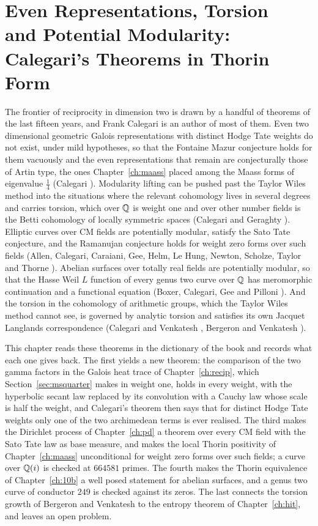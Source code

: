 \chapter[Even Representations, Torsion and Potential Modularity]{Even Representations, Torsion\\ and Potential Modularity:\\ Calegari's Theorems in Thorin Form}\label{ch:cal}

The frontier of reciprocity in dimension two is drawn by a handful of theorems of the last fifteen years, and Frank Calegari is an author of most of them. Even two dimensional geometric Galois representations with distinct Hodge Tate weights do not exist, under mild hypotheses, so that the Fontaine Mazur conjecture holds for them vacuously and the even representations that remain are conjecturally those of Artin type, the ones Chapter~\ref{ch:maass} placed among the Maass forms of eigenvalue $\frac14$ (Calegari \cite{calegari2011,calegari2012}). Modularity lifting can be pushed past the Taylor Wiles method into the situations where the relevant cohomology lives in several degrees and carries torsion, which over $\mathbb{Q}$ is weight one and over other number fields is the Betti cohomology of locally symmetric spaces (Calegari and Geraghty \cite{calegarigeraghty2018}). Elliptic curves over CM fields are potentially modular, satisfy the Sato Tate conjecture, and the Ramanujan conjecture holds for weight zero forms over such fields (Allen, Calegari, Caraiani, Gee, Helm, Le Hung, Newton, Scholze, Taylor and Thorne \cite{accghlnstt2023}). Abelian surfaces over totally real fields are potentially modular, so that the Hasse Weil $L$ function of every genus two curve over $\mathbb{Q}$ has meromorphic continuation and a functional equation (Boxer, Calegari, Gee and Pilloni \cite{bcgp2021}). And the torsion in the cohomology of arithmetic groups, which the Taylor Wiles method cannot see, is governed by analytic torsion and satisfies its own Jacquet Langlands correspondence (Calegari and Venkatesh \cite{calegarivenkatesh2019}, Bergeron and Venkatesh \cite{bergeronvenkatesh2013}).

This chapter reads these theorems in the dictionary of the book and records what each one gives back. The first yields a new theorem: the comparison of the two gamma factors in the Galois heat trace of Chapter~\ref{ch:recip}, which Section~\ref{sec:msquarter} makes in weight one, holds in every weight, with the hyperbolic secant law replaced by its convolution with a Cauchy law whose scale is half the weight, and Calegari's theorem then says that for distinct Hodge Tate weights only one of the two archimedean terms is ever realised. The third makes the Dirichlet process of Chapter~\ref{ch:pd} a theorem over every CM field with the Sato Tate law as base measure, and makes the local Thorin positivity of Chapter~\ref{ch:maass} unconditional for weight zero forms over such fields; a curve over $\mathbb{Q}(i)$ is checked at $664581$ primes. The fourth makes the Thorin equivalence of Chapter~\ref{ch:10b} a well posed statement for abelian surfaces, and a genus two curve of conductor $249$ is checked against its zeros. The last connects the torsion growth of Bergeron and Venkatesh to the entropy theorem of Chapter~\ref{ch:hit}, and leaves an open problem.

